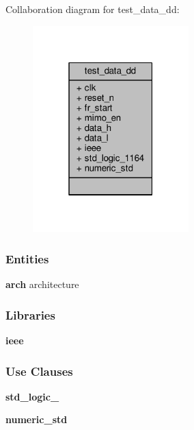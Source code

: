 Collaboration diagram for test\+\_\+data\+\_\+dd\+:\nopagebreak
\begin{figure}[H]
\begin{center}
\leavevmode
\includegraphics[width=171pt]{d2/d7b/classtest__data__dd__coll__graph}
\end{center}
\end{figure}
\subsubsection*{Entities}
\begin{DoxyCompactItemize}
\item 
{\bf arch} architecture
\end{DoxyCompactItemize}
\subsubsection*{Libraries}
 \begin{DoxyCompactItemize}
\item 
{\bf ieee} 
\end{DoxyCompactItemize}
\subsubsection*{Use Clauses}
 \begin{DoxyCompactItemize}
\item 
{\bf std\+\_\+logic\+\_}   
\item 
{\bf numeric\+\_\+std}   
\end{DoxyCompactItemize}
